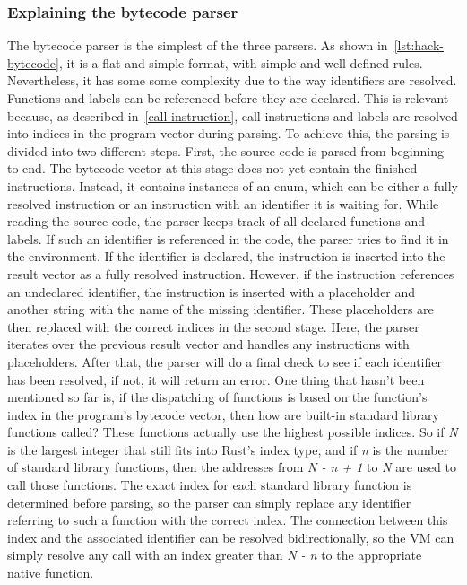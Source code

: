 \subsubsection{Explaining the bytecode parser}
The bytecode parser is the simplest of the three parsers. As shown in~\cref{lst:hack-bytecode}, it is a flat and simple format, with simple and well-defined rules. Nevertheless, it has some some complexity due to the way identifiers are resolved. Functions and labels can be referenced before they are declared. This is relevant because, as described in~\cref{call-instruction}, call instructions and labels are resolved into indices in the program vector during parsing.
To achieve this, the parsing is divided into two different steps.
First, the source code is parsed from beginning to end. The bytecode vector at this stage does not yet contain the finished instructions.
Instead, it contains instances of an enum, which can be either a fully resolved instruction or an instruction with an identifier it is waiting for. While reading the source code, the parser keeps track of all declared functions and labels.
If such an identifier is referenced in the code, the parser tries to find it in the environment. If the identifier is declared, the instruction is inserted into the result vector as a fully resolved instruction. However, if the instruction references an undeclared identifier, the instruction is inserted with a placeholder and another string with the name of the missing identifier.
These placeholders are then replaced with the correct indices in the second stage. Here, the parser iterates over the previous result vector and handles any instructions with placeholders.
After that, the parser will do a final check to see if each identifier has been resolved, if not, it will return an error.
One thing that hasn't been mentioned so far is, if the dispatching of functions is based on the function's index in the program's bytecode vector, then how are built-in standard library functions called?
These functions actually use the highest possible indices. So if \emph{N} is the largest integer that still fits into Rust's index type, and if \emph{n} is the number of standard library functions, then the addresses from \emph{N - n + 1} to \emph{N} are used to call those functions.
The exact index for each standard library function is determined before parsing, so the parser can simply replace any identifier referring to such a function with the correct index.
The connection between this index and the associated identifier can be resolved bidirectionally, so the VM can simply resolve any call with an index greater than \emph{N - n} to the appropriate native function.

